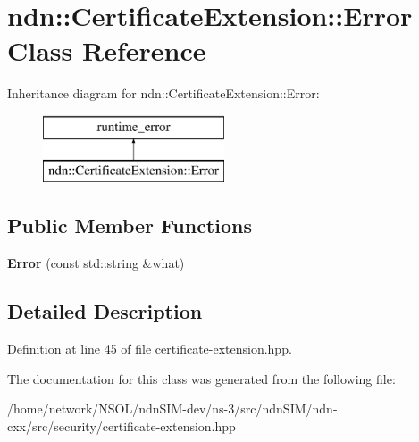 \hypertarget{classndn_1_1CertificateExtension_1_1Error}{}\section{ndn\+:\+:Certificate\+Extension\+:\+:Error Class Reference}
\label{classndn_1_1CertificateExtension_1_1Error}
Inheritance diagram for ndn\+:\+:Certificate\+Extension\+:\+:Error\+:\begin{figure}[H]
\begin{center}
\leavevmode
\includegraphics[height=2.000000cm]{classndn_1_1CertificateExtension_1_1Error}
\end{center}
\end{figure}
\subsection*{Public Member Functions}
\begin{DoxyCompactItemize}
\item 
{\bfseries Error} (const std\+::string \&what)\hypertarget{classndn_1_1CertificateExtension_1_1Error_a426061784523cb39ce5146d10531af35}{}\label{classndn_1_1CertificateExtension_1_1Error_a426061784523cb39ce5146d10531af35}

\end{DoxyCompactItemize}


\subsection{Detailed Description}


Definition at line 45 of file certificate-\/extension.\+hpp.



The documentation for this class was generated from the following file\+:\begin{DoxyCompactItemize}
\item 
/home/network/\+N\+S\+O\+L/ndn\+S\+I\+M-\/dev/ns-\/3/src/ndn\+S\+I\+M/ndn-\/cxx/src/security/certificate-\/extension.\+hpp\end{DoxyCompactItemize}
